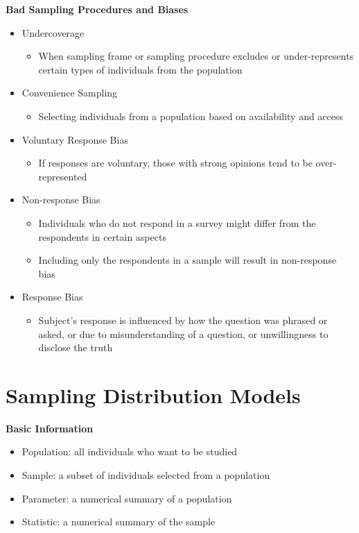 \documentclass{article}
\begin{document}
\noindent
\textbf{Bad Sampling Procedures and Biases}
\begin{itemize}
    \item Undercoverage
    \begin{itemize}
        \item When sampling frame or sampling procedure excludes or under-represents certain types of individuals from the population 
    \end{itemize}
    \item Convenience Sampling
    \begin{itemize}
        \item Selecting individuals from a population based on availability and access
    \end{itemize}
    \item Voluntary Response Bias
    \begin{itemize}
        \item If responses are voluntary, those with strong opinions tend to be over-represented 
    \end{itemize}
    \item Non-response Bias
    \begin{itemize}
        \item Individuals who do not respond in a survey might differ from the respondents in certain aspects
        \item Including only the respondents in a sample will result in non-response bias
    \end{itemize}
    \item Response Bias
    \begin{itemize}
        \item Subject's response is influenced by how the question was phrased or asked, or due to misunderstanding of a question, or unwillingness to disclose the truth 
    \end{itemize}
\end{itemize}

\section{Sampling Distribution Models}

\textbf{Basic Information}
\begin{itemize}
    \item Population: all individuals who want to be studied 
    \item Sample: a subset of individuals selected from a population
    \item Parameter: a numerical summary of a population
    \item Statistic: a numerical summary of the sample
\end{itemize}
\end{document}
